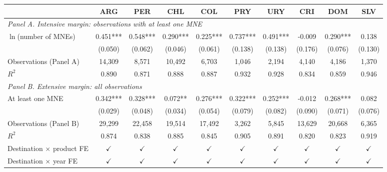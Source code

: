 \begin{tabular}{l*{9}{c}}
\toprule
 & ARG & PER & CHL & COL & PRY & URY & CRI & DOM & SLV \\
\midrule
\multicolumn{10}{l}{\textit{Panel A. Intensive margin: observations with at least one MNE}} \\
$\ln$(number of MNEs) & 0.451*** & 0.548*** & 0.290*** & 0.225*** & 0.737*** & 0.491*** & -0.009 & 0.290*** & 0.138 \\
 & (0.050) & (0.062) & (0.046) & (0.061) & (0.138) & (0.138) & (0.176) & (0.076) & (0.130) \\
Observations (Panel A) & 14,309 & 8,571 & 10,492 & 6,703 & 1,046 & 2,194 & 4,140 & 4,186 & 1,370 \\
$R^2$ & 0.890 & 0.871 & 0.888 & 0.887 & 0.932 & 0.928 & 0.834 & 0.859 & 0.946 \\
\midrule
\multicolumn{10}{l}{\textit{Panel B. Extensive margin: all observations}} \\
At least one MNE & 0.342*** & 0.328*** & 0.072** & 0.276*** & 0.322*** & 0.252*** & -0.012 & 0.268*** & 0.082 \\
 & (0.029) & (0.048) & (0.034) & (0.054) & (0.079) & (0.082) & (0.090) & (0.071) & (0.076) \\
Observations (Panel B) & 29,299 & 22,458 & 19,514 & 17,492 & 3,262 & 5,845 & 13,629 & 20,668 & 6,365 \\
$R^2$ & 0.874 & 0.838 & 0.885 & 0.845 & 0.905 & 0.891 & 0.820 & 0.823 & 0.919 \\
\midrule
Destination $\times$ product FE & $\checkmark$ & $\checkmark$ & $\checkmark$ & $\checkmark$ & $\checkmark$ & $\checkmark$ & $\checkmark$ & $\checkmark$ & $\checkmark$ \\
Destination $\times$ year FE & $\checkmark$ & $\checkmark$ & $\checkmark$ & $\checkmark$ & $\checkmark$ & $\checkmark$ & $\checkmark$ & $\checkmark$ & $\checkmark$ \\
\bottomrule
\end{tabular}
